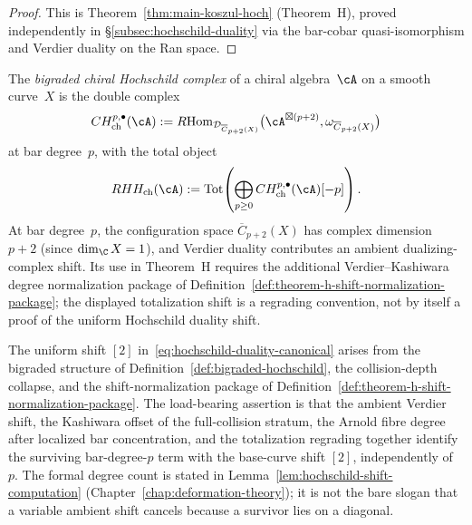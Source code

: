 \begin{proof}
This is Theorem~\ref{thm:main-koszul-hoch} (Theorem~H), proved
independently in \S\ref{subsec:hochschild-duality} via
the bar-cobar quasi-isomorphism and Verdier duality on the Ran space.
\end{proof}

\begin{definition}
\label{def:bigraded-hochschild}
The \emph{bigraded chiral Hochschild complex} of a chiral
algebra~$\cA$ on a smooth curve~$X$ is the double complex
\[
CH^{p,\bullet}_{\mathrm{ch}}(\cA) :=
R\mathrm{Hom}_{\mathcal{D}_{\overline{C}_{p+2}(X)}}
\bigl(\cA^{\boxtimes(p+2)}, \omega_{\overline{C}_{p+2}(X)}\bigr)
\]
at bar degree~$p$, with the total object
\[
RHH_{\mathrm{ch}}(\cA) :=
\operatorname{Tot}\!\left(
\bigoplus_{p \geq 0} CH^{p,\bullet}_{\mathrm{ch}}(\cA)[-p]
\right).
\]
At bar degree~$p$, the configuration space
$\overline{C}_{p+2}(X)$ has complex dimension~$p + 2$
\textup{(}since $\dim_\C X = 1$\textup{)}, and Verdier duality
contributes an ambient dualizing-complex shift.  Its use in
Theorem~H requires the additional Verdier--Kashiwara degree
normalization package of
Definition~\ref{def:theorem-h-shift-normalization-package}; the
displayed totalization shift is a regrading convention, not by itself
a proof of the uniform Hochschild duality shift.
\end{definition}

\begin{remark}\label{rem:hochschild-shift-origin}
The uniform shift $[2]$ in~\eqref{eq:hochschild-duality-canonical}
arises from the bigraded structure of
Definition~\ref{def:bigraded-hochschild}, the collision-depth
collapse, and the shift-normalization package of
Definition~\ref{def:theorem-h-shift-normalization-package}.  The
load-bearing assertion is that the ambient Verdier shift, the
Kashiwara offset of the full-collision stratum, the Arnold fibre
degree after localized bar concentration, and the totalization
regrading together identify the surviving bar-degree-\(p\) term with
the base-curve shift \([2]\), independently of~\(p\).  The formal
degree count is stated in Lemma~\ref{lem:hochschild-shift-computation}
(Chapter~\ref{chap:deformation-theory}); it is not the bare slogan
that a variable ambient shift cancels because a survivor lies on a
diagonal.
\end{remark}


